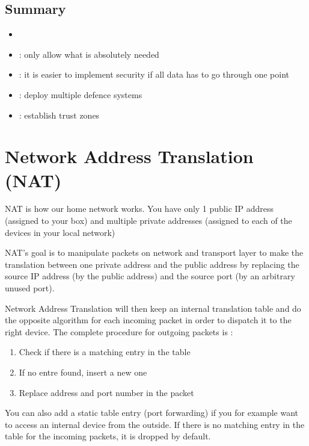 \section{Summary}

\begin{itemize}
    \item {}
    \item {} : only allow what is absolutely needed
    \item {} : it is easier to implement security if all data has to go through one point
    \item {} : deploy multiple defence systems
    \item {} : establish trust zones
\end{itemize}

\chapter{Network Address Translation (NAT)}

NAT is how our home network works. You have only 1 public IP address (assigned to your box) and multiple private addresses (assigned to each of the devices in your local network)

NAT's goal is to manipulate packets on network and transport layer to make the translation between one private address and the public address by replacing the source IP address (by the public address) and the source port (by an arbitrary unused port).

Network Address Translation will then keep an internal translation table and do the opposite algorithm for each incoming packet in order to dispatch it to the right device. The complete procedure for outgoing packets is :
\begin{enumerate}
    \item Check if there is a matching entry in the table
    \item If no entre found, insert a new one
    \item Replace address and port number in the packet
\end{enumerate}

You can also add a static table entry (port forwarding) if you for example want to access an internal device from the outside. If there is no matching entry in the table for the incoming packets, it is dropped by default.

